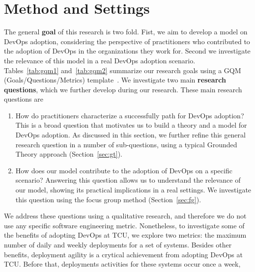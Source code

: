 \section{Method and Settings}\label{sec:method}

  The general {\bf goal} of this research is two fold.
  Fist, we aim to develop
  a model on DevOps adoption, considering the perspective of practitioners who
  contributed to the adoption of DevOps in the
  organizations they work for. Second we investigate the relevance
  of this model in a real DevOps adoption scenario.
  Tables~\ref{tab:gqm1} and~\ref{tab:gqm2} summarize our
  research goals using a GQM (Goals/Questions/Metrics)
  template~\cite{wohlin:book}.
  We investigate two main {\bf research questions}, which we
  further develop during our research. These main research
  questions are

\begin{enumerate}[(RQ1)]
 \item How do practitioners characterize a successfully path
   for DevOps adoption? This is a broad question that motivates
   us to build a theory and a model for DevOps adoption. As discussed
   in this section, we further refine this general research question
   in a number of sub-questions, using a typical Grounded Theory approach
   (Section~\ref{sec:gt}).

 \item How does our model contribute to the adoption of DevOps on a
   specific scenario? Answering this question allows us to understand
   the relevance of our model, showing its practical implications
   in a real settings. We investigate this question using the
   focus group method (Section~\ref{sec:fg}).
\end{enumerate}

We address these questions using a qualitative research, and
therefore we do not use any specific software engineering
metric. Nonetheless, to investigate some of the benefits of
adopting DevOps at TCU, we explore two metrics: the maximum number of daily and weekly deployments
for a set of systems. Besides other benefits, deployment agility
is a crytical achievement from adopting DevOps at
TCU. Before that, deployments activities for these
systems occur once a week,

